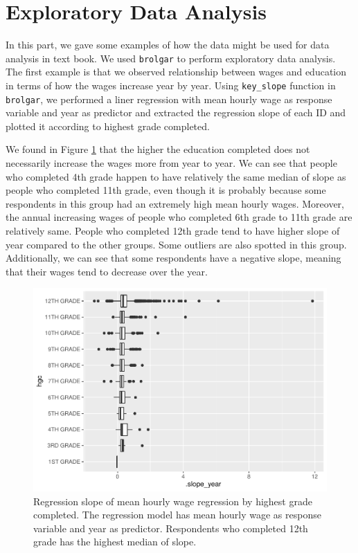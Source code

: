 \hypertarget{exploratory-data-analysis}{%
\section{Exploratory Data Analysis}\label{exploratory-data-analysis}}

In this part, we gave some examples of how the data might be used for
data analysis in text book. We used \texttt{brolgar} \citep{brolgar} to
perform exploratory data analysis. The first example is that we observed
relationship between wages and education in terms of how the wages
increase year by year. Using \texttt{key\_slope} function in
\texttt{brolgar}, we performed a liner regression with mean hourly wage
as response variable and year as predictor and extracted the regression
slope of each ID and plotted it according to highest grade completed.

We found in Figure \ref{fig:wages-slope} that the higher the education
completed does not necessarily increase the wages more from year to
year. We can see that people who completed 4th grade happen to have
relatively the same median of slope as people who completed 11th grade,
even though it is probably because some respondents in this group had an
extremely high mean hourly wages. Moreover, the annual increasing wages
of people who completed 6th grade to 11th grade are relatively same.
People who completed 12th grade tend to have higher slope of year
compared to the other groups. Some outliers are also spotted in this
group. Additionally, we can see that some respondents have a negative
slope, meaning that their wages tend to decrease over the year.

\begin{Schunk}
\begin{figure}
\includegraphics{figures/wages-slope-1} \caption[Regression slope of mean hourly wage regression by highest grade completed]{Regression slope of mean hourly wage regression by highest grade completed. The regression model has mean hourly wage as response variable and year as predictor. Respondents who completed 12th grade has the highest median of slope.}\label{fig:wages-slope}
\end{figure}
\end{Schunk}


